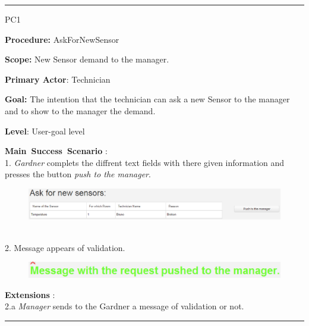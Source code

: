 \vspace{0.5cm}
\hrule
\hfill \break
\begin{lyxlist}{PC1}
\small{
\item [\textbf{Procedure:}] AskForNewSensor
\item [\textbf{Scope:}] New Sensor demand to the manager.
\item [\textbf{Primary Actor}:] Technician
\item [\textbf{Goal:}] The intention that the technician can ask a new Sensor to
the manager and to show to the manager the demand.
\item [\textbf{Level}:] User-goal level
\item [\textbf{Main~Success~Scenario}]:\\
1. \emph{Gardner} complets the diffrent text fields with there given
information and presses the button \emph{push to the manager}. 
\begin{figure}
\includegraphics[width=1\textwidth]{images/AskForNewSensor.eps}
\end{figure} \\
2. Message appears of validation.
 \begin{figure}
\includegraphics[width=1\textwidth]{images/RequestAskForNewSensor.eps}
\end{figure}
\item [\textbf{Extensions}]:\\
2.a  \emph{Manager} sends to the Gardner a message of
validation or not.\\
}
\end{lyxlist}
\hrule
\vspace{0.5cm}

\break

